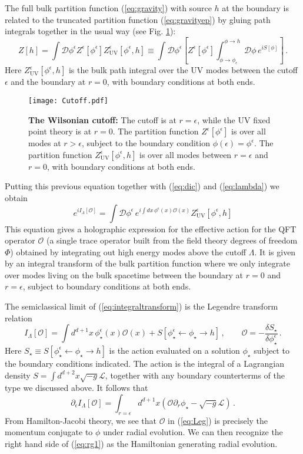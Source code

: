 \documentclass[10pt, oneside]{book}
\let\pa=\partial
\def\be{\begin{equation}}
\def\ee{\end{equation}}
\def\ep{{\epsilon}}
\def\Lag{{\mathcal{L}}}
\def\ocal{{\mathcal{O}}}
\begin{document}
\begin{doublespace}
The full bulk partition function (\ref{eq:gravity}) with source $h$ at the boundary is related to the truncated partition function (\ref{eq:gravityep}) by gluing path integrals together in the usual way (see Fig. \ref{fig:glue}):
\be
Z[h] =  \int {\mathcal D \phi^\epsilon} Z^\epsilon[\phi^\epsilon] Z^\epsilon_\text{UV}[\phi^\epsilon,h] \equiv \int {\mathcal D \phi^\epsilon} \left[ Z^\epsilon[\phi^\epsilon] \int_{\phi \to \phi_\epsilon}^{\phi \to h} {\mathcal D \phi} \, e^{i S[\phi]} \right] \,.
\ee
Here $Z^\epsilon_\text{UV}[\phi^\epsilon,h]$ is the bulk path integral over the UV modes between the cutoff $\epsilon$ and the boundary at $r=0$, with boundary conditions at both ends.
\begin{figure}[h]
\centering
\texttt{[image: Cutoff.pdf]}
\caption{\label{fig:glue} {\bf The Wilsonian cutoff:} The cutoff is at $r=\epsilon$, while the UV fixed point theory is at $r=0$. The partition function $Z^\epsilon[\phi^\epsilon]$ is over all modes at $r > \epsilon$, subject to the boundary condition $\phi(\epsilon) = \phi^\epsilon$. The partition function $Z^\epsilon_\text{UV}[\phi^\epsilon,h]$ is over all modes between $r=\epsilon$ and $r=0$, with boundary conditions at both ends.}
\end{figure}
Putting this previous equation together with (\ref{eq:dic}) and (\ref{eq:lambda}) we obtain
\be\label{eq:integraltransform}
e^{i I_\Lambda[\ocal]} = \int {\mathcal D \phi^\epsilon} \, e^{i \int dx \, \phi^\epsilon(x) \ocal(x)} Z^\epsilon_\text{UV}[\phi^\epsilon,h] 
\ee
This equation gives a holographic expression for the effective action for the QFT operator $\ocal$ (a single trace operator built from the field theory degrees of freedom $\Phi$) obtained by integrating out high energy modes above the cutoff $\Lambda$. It is given by an integral transform of the bulk partition function where we only integrate over modes living on the bulk spacetime between the boundary at $r=0$ and $r=\epsilon$, subject to boundary conditions at both ends.

The semiclassical limit of (\ref{eq:integraltransform}) is the Legendre transform relation
\be\label{eq:Leg}
I_\Lambda[\ocal] = \int d^{d+1}x \, \phi_\star^\epsilon(x) \ocal(x) + S[\phi^\epsilon_\star \gets \phi_\star \to h] \,, \qquad \ocal = - \frac{\delta S_\star}{\delta \phi^\epsilon_\star} \,.
\ee
Here $S_\star \equiv S[\phi^\epsilon_\star \gets \phi_\star \to h]$ is the action evaluated on a solution $\phi_\star$ subject to the boundary conditions indicated. The action is the integral of a Lagrangian density $S = \int d^{d+2}x \sqrt{-g} \Lag$, together with any boundary counterterms of the type we discussed above. It follows that
\be\label{eq:rg1}
\pa_\epsilon I_\Lambda[\ocal] = \int_{r=\ep} d^{d+1}x \left(\ocal \pa_r \phi_\star - \sqrt{-g} \Lag \right) \,.
\ee
From Hamilton-Jacobi theory, we see that $\ocal$ in (\ref{eq:Leg}) is precisely the momentum conjugate to $\phi$ under radial evolution. We can then recognize the right hand side of (\ref{eq:rg1}) as the Hamiltonian generating radial evolution.


\end{doublespace}
\end{document}
